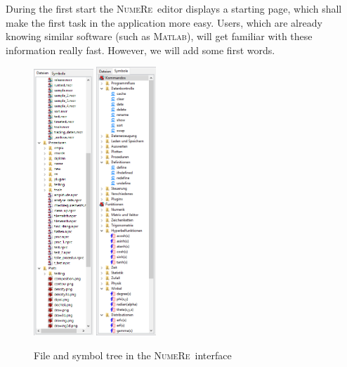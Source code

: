 \documentclass[DIV=14,headsepline,footsepline]{scrbook}
\newcommand{\NR}{\textsc{Nu\-me\-Re}}
\begin{document}
				During the first start the \NR\ editor displays a starting page, which shall make the first task in the application more easy. Users, which are already knowing similar software (such as \textsc{Matlab}), will get familiar with these information really fast. However, we will add some first words.
				\begin{figure}[p]%
					\centering
					\includegraphics[width=0.2\textwidth]{_graphics/filetree.png}\hspace{5em}
					\includegraphics[width=0.2\textwidth]{_graphics/symboltree.png}
					\caption{File and symbol tree in the \NR\ interface}
					\label{fig:trees}
				\end{figure}
				
\end{document}
